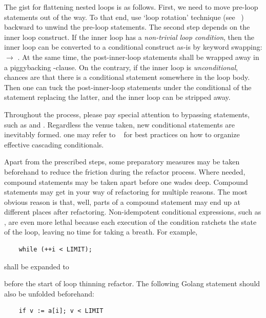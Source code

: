 The gist for flattening nested loops is as follows.
First, we need to move pre-loop statements out of the way.
To that end, use `loop rotation' technique (see ~) backward
to unwind the pre-loop statements.
The second step depends on the inner loop construct.
If the inner loop has a \emph{non-trivial loop condition}, then the inner loop can
be converted to a conditional construct as-is by keyword swapping:  $\rightarrow$
.
At the same time, the post-inner-loop statements shall be wrapped away in a piggybacking
-clause.
On the contrary, if the inner loop is \emph{unconditional}, chances are that
there is a conditional  statement somewhere in the loop body.
Then one can tuck the post-inner-loop statements under the conditional of the
 statement replacing the latter, and the inner loop can be stripped away.


Throughout the process, please pay special attention to bypassing statements, such as
 and .
Regardless the venue taken, new conditional statements are inevitably formed.
one may refer to ~ for best practices on how to organize effective
cascading conditionals.


Apart from the prescribed steps, some preparatory measures may be taken beforehand
to reduce the friction during the refactor process.
Where needed, compound statements may be taken apart before one wades deep.
Compound statements may get in your way of refactoring for multiple reasons.
The most obvious reason is that, well, parts of a compound statement
may end up at different places after refactoring.
Non-idempotent conditional expressions, such as , are even more lethal
because each execution of the condition ratchets the state of the loop, leaving no time for
taking a breath.
For example,
\begin{lstlisting}
    while (++i < LIMIT);
\end{lstlisting}
shall be expanded to

before the start of loop thinning refactor.
The following Golang statement should also be unfolded beforehand:
\begin{lstlisting}
    if v := a[i]; v < LIMIT
\end{lstlisting}


